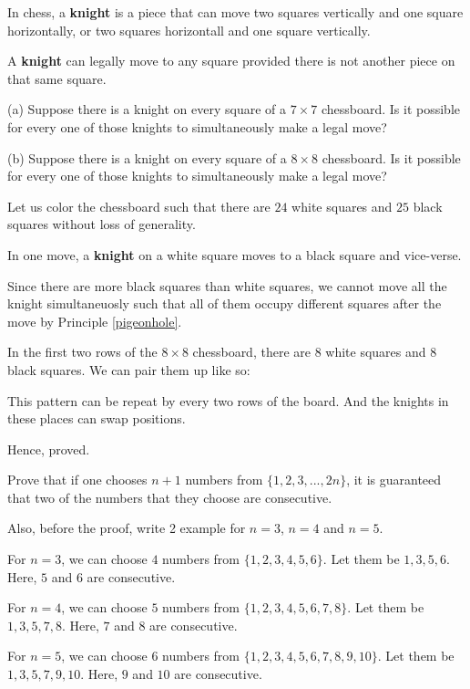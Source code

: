 \bp 
	In chess, a \textbf{knight} is a piece that can move two squares vertically and one square horizontally, or two squares horizontall and one square vertically.

	A \textbf{knight} can legally move to any square provided there is not another piece on that same square.

	(a) Suppose there is a knight on every square of a $7 \times 7$ chessboard. Is it possible for every one of those knights to simultaneously make a legal move?

	(b) Suppose there is a knight on every square of a $8 \times 8$ chessboard. Is it possible for every one of those knights to simultaneously make a legal move?
\ep 


\bs[a]
Let us color the chessboard such that there are $24$ white squares and $25$ black squares without loss of generality.

In one move, a \textbf{knight} on a white square moves to a black square and vice-verse.

Since there are more black squares than white squares, we cannot move all the knight simultaneuosly such that all of them occupy different squares after the move by Principle \ref{pigeonhole}.
\es

\bs[b]
	In the first two rows of the $8 \times 8$ chessboard, there are $8$ white squares and $8$ black squares. We can pair them up like so:
\bigbreak


This pattern can be repeat by every two rows of the board. And the knights in these places can swap positions.

Hence, proved.

\es

\bp 
	Prove that if one chooses $n+1$ numbers from $\{1, 2, 3, ..., 2n\}$, it is guaranteed that two of the numbers that they choose are consecutive.

	Also, before the proof, write 2 example for $n=3$, $n=4$ and $n=5$.
\ep 

\begin{scratch}
	For $n=3$, we can choose $4$ numbers from $\{1, 2, 3, 4, 5, 6\}$. Let them be $1, 3, 5, 6$. Here, $5$ and $6$ are consecutive.

	For $n=4$, we can choose $5$ numbers from $\{1, 2, 3, 4, 5, 6, 7, 8\}$. Let them be $1, 3, 5, 7, 8$. Here, $7$ and $8$ are consecutive.

	For $n=5$, we can choose $6$ numbers from $\{1, 2, 3, 4, 5, 6, 7, 8, 9, 10\}$. Let them be $1, 3, 5, 7, 9, 10$. Here, $9$ and $10$ are consecutive.
\end{scratch}

